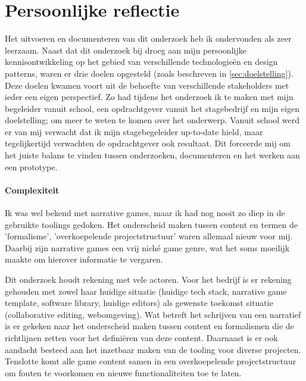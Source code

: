 \chapter{Persoonlijke reflectie}
\label{ch:reflection}
Het uitvoeren en documenteren van dit onderzoek heb ik ondervonden als zeer leerzaam. Naast dat dit onderzoek bij droeg aan mijn persoonlijke kennisontwikkeling op het gebied van verschillende technologieën en design patterns, waren er drie doelen opgesteld (zoals beschreven in \autoref{sec:doelstelling}). Deze doelen kwamen voort uit de behoefte van verschillende stakeholders met ieder een eigen perspectief. Zo had tijdens het onderzoek ik te maken met mijn begeleider vanuit school, een opdrachtgever vanuit het stagebedrijf en mijn eigen doelstelling; om meer te weten te komen over het onderwerp. Vanuit school werd er van mij verwacht dat ik mijn stagebegeleider up-to-date hield, maar tegelijkertijd verwachten de opdrachtgever ook resultaat. Dit forceerde mij om het juiste balans te vinden tussen onderzoeken, documenteren en het werken aan een prototype.

\subsubsection{Complexiteit}
Ik was wel bekend met narrative games, maar ik had nog nooit zo diep in de gebruikte toolings gedoken. Het onderscheid maken tussen content en termen de 'formalisme', 'overkoepelende projectstructuur' waren allemaal nieuw voor mij. Daarbij zijn narrative games een vrij niché game genre, wat het soms moeilijk maakte om hierover informatie te vergaren. 

Dit onderzoek houdt rekening met vele actoren. Voor het bedrijf is er rekening gehouden met zowel haar huidige situatie (huidige tech stack, narrative game template, software library, huidige editors) als gewenste toekomst situatie (collaborative editing, webomgeving). Wat betreft het schrijven van een narratief is er gekeken naar het onderscheid maken tussen content en formalismen die de richtlijnen zetten voor het definiëren van deze content. Daarnaast is er ook aandacht besteed aan het inzetbaar maken van de tooling voor diverse projecten. Tenslotte komt alle game content samen in een overkoepelende projectstructuur om fouten te voorkomen en nieuwe functionaliteiten toe te laten.

